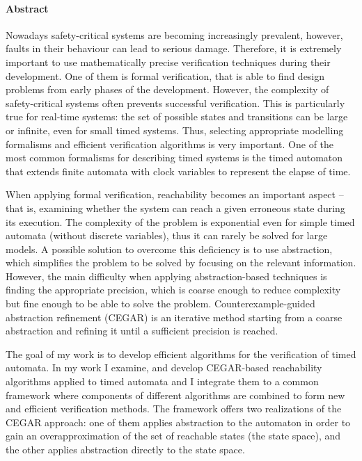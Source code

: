 

\paragraph*{Abstract}
{}
\thispagestyle{plain}

Nowadays safety-critical systems are becoming increasingly prevalent, however, faults in their behaviour can lead to serious damage. Therefore, it is extremely important to use mathematically precise verification techniques during their development. One of them is formal verification, that is able to find design problems from early phases of the development. However, the complexity of safety-critical systems often prevents successful verification. This is particularly true for real-time systems: the set of possible states and transitions can be large or infinite, even for small timed systems. Thus, selecting appropriate modelling formalisms and efficient verification algorithms is very important. One of the most common formalisms for describing timed systems is the timed automaton that extends finite automata with clock variables to represent the elapse of time.

When applying formal verification, reachability becomes an important aspect – that is, examining whether the system can reach a given erroneous state during its execution. The complexity of the problem is exponential even for simple timed automata (without discrete variables), thus it can rarely be solved for large models. A possible solution to overcome this deficiency is to use abstraction, which simplifies the problem to be solved by focusing on the relevant information. However, the main difficulty when applying abstraction-based techniques is finding the appropriate precision, which is coarse enough to reduce complexity but fine enough to be able to solve the problem. Counterexample-guided abstraction refinement (CEGAR) is an iterative method starting from a coarse abstraction and refining it until a sufficient precision is reached.

The goal of my work is to develop efficient algorithms for the verification of timed automata. In my work I examine, and develop CEGAR-based reachability algorithms applied to timed automata and I integrate them to a common framework where components of different algorithms are combined to form new and efficient verification methods. The framework offers two realizations of the CEGAR approach: one of them applies abstraction to the automaton in order to gain an overapproximation of the set of reachable states (the state space), and the other applies abstraction directly to the state space.

